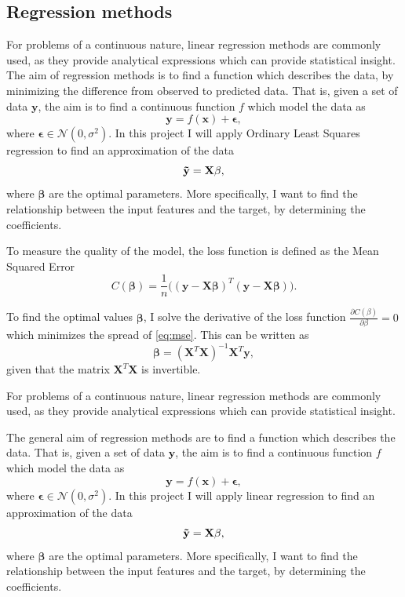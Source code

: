 \subsection{Regression methods}\label{ssec:regression_methods}
For problems of a continuous nature, linear regression methods are commonly used, as they provide analytical expressions which can provide statistical insight. The aim of regression methods is to find a function which describes the data, by minimizing the difference from observed to predicted data. That is, given a set of data $\mathbf{y}$, the aim is to find a continuous function $f$ which model the data as
\begin{equation*}
    \mathbf{y} = f( \mathbf{x} ) + \mathbf{\epsilon}, 
\end{equation*}
where $\mathbf{\epsilon} \in \mathcal{N}(0, \sigma^{2})$. In this project I will apply Ordinary Least Squares regression to find an approximation of the data 
\begin{equation*}
    \mathbf{\Tilde{y}} = \mathbf{X} \mathbf{\beta},
\end{equation*}
where $\mathbf{\beta}$ are the optimal parameters. More specifically, I want to find the relationship between the input features and the target, by determining the coefficients. 

To measure the quality of the model, the loss function is defined as the Mean Squared Error
\begin{equation}\label{eq:mse}
    C (\mathbf{\beta}) = \frac{1}{n} \big( (\mathbf{y} - \mathbf{X} \mathbf{\beta})^{T} (\mathbf{y} - \mathbf{X} \mathbf{\beta}) \big).
\end{equation}

To find the optimal values $\mathbf{\beta}$, I solve the derivative of the loss function $\frac{\partial C (\beta)}{\partial \beta} = 0$ which minimizes the spread of \eqref{eq:mse}. This can be written as  
\begin{equation}
    \mathbf{\beta} = (\mathbf{X}^{T}\mathbf{X})^{-1} \mathbf{X}^{T} \mathbf{y},
\end{equation}
given that the matrix $\mathbf{X}^{T}\mathbf{X}$ is invertible.


For problems of a continuous nature, linear regression methods are commonly used, as they provide analytical expressions which can provide statistical insight. 

The general aim of regression methods are to find a function which describes the data. That is, given a set of data $\mathbf{y}$, the aim is to find a continuous function $f$ which model the data as
\begin{equation*}
    \mathbf{y} = f( \mathbf{x} ) + \mathbf{\epsilon}, 
\end{equation*}
where $\mathbf{\epsilon} \in \mathcal{N}(0, \sigma^{2})$. In this project I will apply linear regression to find an approximation of the data 
\begin{equation*}
    \mathbf{\Tilde{y}} = \mathbf{X} \mathbf{\beta},
\end{equation*}
where $\mathbf{\beta}$ are the optimal parameters. More specifically, I want to find the relationship between the input features and the target, by determining the coefficients. 

